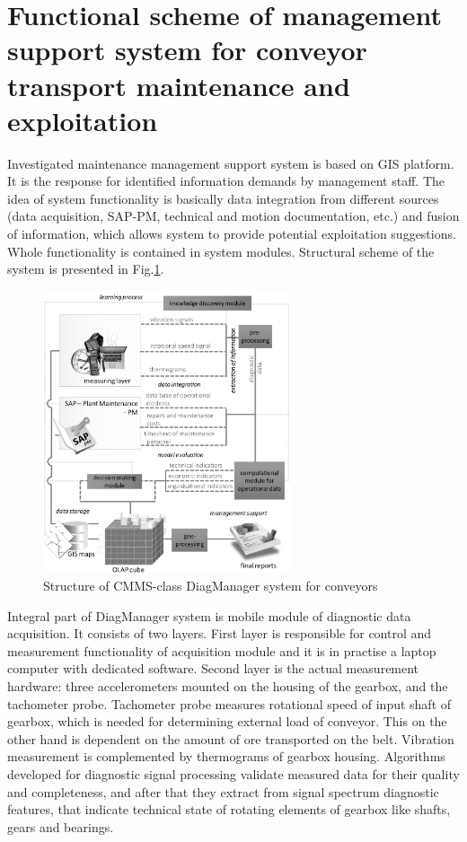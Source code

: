 \section{Functional scheme of management support system for conveyor transport maintenance and exploitation}
Investigated maintenance management support system is based on GIS platform. It is the response for identified information demands by management staff. The idea of system functionality is basically data integration from different sources (data acquisition, SAP-PM, technical and motion documentation, etc.) and fusion of information, which allows system to provide potential exploitation suggestions. Whole functionality is contained in system modules. Structural scheme of the system is presented in Fig.\ref{fig: f3}.
\begin{figure}[ht!]
\centering
\includegraphics[width = 0.65\textwidth]{Wykresy/Fig_3}
\caption{Structure of CMMS-class DiagManager system for conveyors}
\label{fig: f3}
\end{figure} \par
Integral part of DiagManager system is mobile module of diagnostic data acquisition. It consists of two layers. First layer is responsible for control and measurement functionality of acquisition module and it is in practise a laptop computer with dedicated software. Second layer is the actual measurement hardware: three  accelerometers mounted on the housing of the gearbox, and the tachometer probe. Tachometer probe measures rotational speed of input shaft of gearbox, which is needed for determining external load of conveyor. This on the other hand is dependent on the amount of ore transported on the belt. Vibration measurement is complemented by thermograms of gearbox housing. Algorithms developed for diagnostic signal processing validate measured data for their quality and completeness, and after that they extract from signal spectrum diagnostic features, that indicate technical state of rotating elements of gearbox like shafts, gears and bearings.\par
